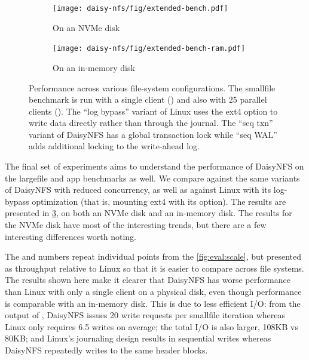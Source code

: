 \begin{figure}[hp]
  \begin{subfigure}[b]{\textwidth}
    \texttt{[image: daisy-nfs/fig/extended-bench.pdf]}
    \caption{On an NVMe disk}
    \label{fig:bench-configs:nvme}
  \end{subfigure}

  \begin{subfigure}[b]{\textwidth}
    \texttt{[image: daisy-nfs/fig/extended-bench-ram.pdf]}
    \caption{On an in-memory disk}
    \label{fig:bench-configs:ram}
  \end{subfigure}
  \vspace{0.5\baselineskip}
  \caption[Benchmarks across file-system configurations]%
  {Performance across various file-system configurations. The smallfile
    benchmark is run with a single client () and also with 25
    parallel clients (). The ``log bypass'' variant of Linux
    uses the  ext4 option to write data directly rather than through the
    journal. The ``seq txn'' variant of DaisyNFS has a global transaction lock
    while ``seq WAL'' adds additional locking to the write-ahead log.}
  \label{fig:bench-configs}
\end{figure}

The final set of experiments aims to understand the performance of DaisyNFS on
the largefile and app benchmarks as well. We compare against the same variants
of DaisyNFS with reduced concurrency, as well as against Linux with its
log-bypass optimization (that is, mounting ext4 with its  option).
The results are presented in \cref{fig:bench-configs},
on both an NVMe disk and an in-memory disk. The results for the NVMe disk have
most of the interesting trends, but there are a few interesting differences
worth noting.

The  and  numbers repeat individual points from
the \cref{fig:eval:scale}, but presented as throughput relative to Linux so that
it is easier to compare across file systems. The  results shown
here make it clearer that DaisyNFS has worse performance than Linux with
only a single client on a physical disk, even though performance is comparable
with an in-memory disk. This is due to less efficient I/O: from the output
of , DaisyNFS issues 20 write requests per smallfile iteration
whereas Linux only requires 6.5 writes on average; the total I/O is also larger,
108KB vs 80KB; and Linux's journaling design results in sequential writes
whereas DaisyNFS repeatedly writes to the same header blocks.

